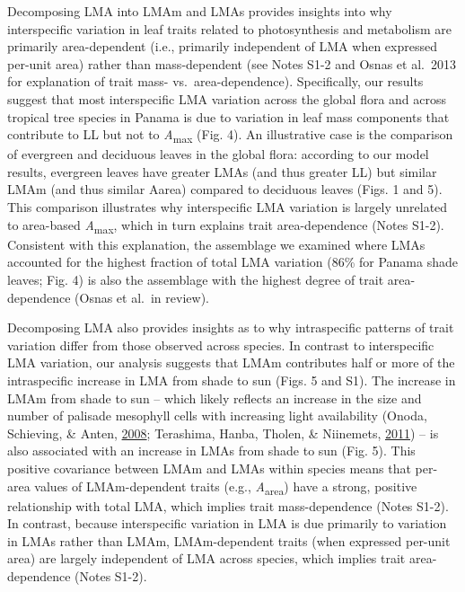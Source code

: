 \documentclass[12pt,]{article}
\theoremstyle{definition}
\theoremstyle{definition}
\theoremstyle{definition}
\theoremstyle{remark}
\begin{document}
Decomposing LMA into LMAm and LMAs provides insights into why
interspecific variation in leaf traits related to photosynthesis and
metabolism are primarily area-dependent (i.e., primarily independent of
LMA when expressed per-unit area) rather than mass-dependent (see Notes
S1-2 and Osnas et al.~2013 for explanation of trait mass-
vs.~area-dependence). Specifically, our results suggest that most
interspecific LMA variation across the global flora and across tropical
tree species in Panama is due to variation in leaf mass components that
contribute to LL but not to \emph{A}\textsubscript{max} (Fig. 4). An
illustrative case is the comparison of evergreen and deciduous leaves in
the global flora: according to our model results, evergreen leaves have
greater LMAs (and thus greater LL) but similar LMAm (and thus similar
Aarea) compared to deciduous leaves (Figs. 1 and 5). This comparison
illustrates why interspecific LMA variation is largely unrelated to
area-based \emph{A}\textsubscript{max}, which in turn explains trait
area-dependence (Notes S1-2). Consistent with this explanation, the
assemblage we examined where LMAs accounted for the highest fraction of
total LMA variation (86\% for Panama shade leaves; Fig. 4) is also the
assemblage with the highest degree of trait area-dependence (Osnas et
al.~in review).

Decomposing LMA also provides insights as to why intraspecific patterns
of trait variation differ from those observed across species. In
contrast to interspecific LMA variation, our analysis suggests that LMAm
contributes half or more of the intraspecific increase in LMA from shade
to sun (Figs. 5 and S1). The increase in LMAm from shade to sun -- which
likely reflects an increase in the size and number of palisade mesophyll
cells with increasing light availability (Onoda, Schieving, \& Anten,
\protect\hyperlink{ref-Onoda2008}{2008}; Terashima, Hanba, Tholen, \&
Niinemets, \protect\hyperlink{ref-Terashima2011}{2011}) -- is also
associated with an increase in LMAs from shade to sun (Fig. 5). This
positive covariance between LMAm and LMAs within species means that
per-area values of LMAm-dependent traits (e.g.,
\emph{A}\textsubscript{area}) have a strong, positive relationship with
total LMA, which implies trait mass-dependence (Notes S1-2). In
contrast, because interspecific variation in LMA is due primarily to
variation in LMAs rather than LMAm, LMAm-dependent traits (when
expressed per-unit area) are largely independent of LMA across species,
which implies trait area-dependence (Notes S1-2).
\end{document}
